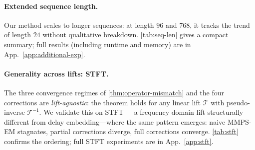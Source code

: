 \documentclass{article}
\theoremstyle{plain}
\theoremstyle{definition}
\theoremstyle{remark}
\newcommand{\tsimg}{\mathcal{T}}
\newcommand{\imgts}{\mathcal{T}^{-1}}
\begin{document}
\paragraph{Extended sequence length.}
Our method scales to longer sequences: at length $96$ and $768$, it tracks the trend of length $24$ without qualitative breakdown. \cref{tab:seq-len} gives a compact summary; full results (including runtime and memory) are in App.~\ref{app:additional-exp}.

\begin{table}[h]
\centering
\caption{Disc.\ score ($\downarrow$) on Energy $50\%$ across sequence lengths. Full sweep in App.~\ref{app:additional-exp}.}
\label{tab:seq-len}
\vspace{-1mm}
\end{table}

\paragraph{Generality across lifts: STFT.}
The three convergence regimes of \cref{thm:operator-mismatch} and the four corrections are \emph{lift-agnostic}: the theorem holds for any linear lift $\tsimg$ with pseudo-inverse $\imgts$. We validate this on STFT~\citep{griffin1984signal}---a frequency-domain lift structurally different from delay embedding---where the same pattern emerges: naive MMPS-EM stagnates, partial corrections diverge, full corrections converge. \cref{tab:stft} confirms the ordering; full STFT experiments are in App.~\ref{app:stft}.

\begin{table}[h]
\centering
\caption{Generality across lifts: disc.\ score ($\downarrow$) on Energy $50\%$ with STFT as the lift. The three-regime pattern matches delay embedding. Full STFT sweep in App.~\ref{app:stft}.}
\label{tab:stft}
\vspace{-1mm}
\end{table}
\end{document}
